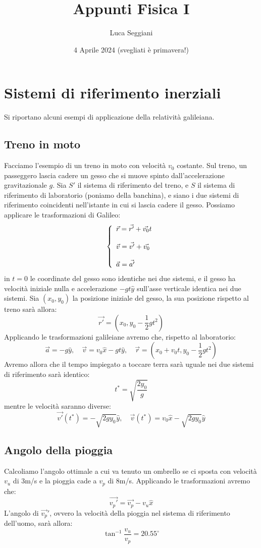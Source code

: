 \documentclass[a4paper,12pt]{article}
\title{Appunti Fisica I}
\author{Luca Seggiani}
\date{4 Aprile 2024 (svegliati è primavera!)}
\begin{document}
\maketitle
\section{Sistemi di riferimento inerziali}
Si riportano alcuni esempi di applicazione della relatività galileiana.
\subsection{Treno in moto}
Facciamo l'esempio di un treno in moto con velocità $v_0$ costante. Sul treno, un passeggero lascia cadere
un gesso che si muove spinto dall'accelerazione gravitazionale $g$. Sia $S'$ il sistema di riferimento del treno,
e $S$ il sistema di riferimento di laboratorio (poniamo della banchina), e siano i due sistemi di riferimento
coincidenti nell'istante in cui si lascia cadere il gesso. Possiamo applicare le trasformazioni di Galileo:
$$ 
\left\{\begin{array}{l}
  \vec{r} = \vec{r'} + \vec{v_0}t \cr \\
  \vec{v} = \vec{v'} + \vec{v_0} \cr \\
  \vec{a} = \vec{a'}
\end{array}\right.
$$
in $t=0$ le coordinate del gesso sono identiche nei due sistemi, e il gesso ha velocità iniziale nulla
e accelerazione $-gt\hat{y}$ sull'asse verticale identica nei due sistemi. Sia $(x_0, y_0)$ la posizione
iniziale del gesso, la sua posizione rispetto al treno sarà allora:
$$ \vec{r'} = (x_0, y_0 -\frac{1}{2}gt^2) $$
Applicando le trasformazioni galileiane avremo che, rispetto al laboratorio:
$$ 
\vec{a} = -g\hat{y}, \quad
\vec{v} = v_0\hat{x} - gt\hat{y}, \quad
\vec{r} = (x_0 + v_0t, y_0 - \frac{1}{2}gt^2) 
$$
Avremo allora che il tempo impiegato a toccare terra sarà uguale nei due sistemi di riferimento sarà identico:
$$ t^* = \sqrt{\frac{2y_0}{g}}$$
mentre le velocità saranno diverse:
$$ \vec{v'}(t^*) = -\sqrt{2gy_0}\hat{y}, \quad \vec{v}(t^*) = v_0\hat{x} - \sqrt{2gy_0}\hat{y} $$
\subsection{Angolo della pioggia}
Calcoliamo l'angolo ottimale a cui va tenuto un ombrello se ci sposta con velocità $v_u$ di 3m/s
e la pioggia cade a $v_p$ di 8m/s. Applicando le trasformazioni avremo che:
$$ \vec{v_p'} = \vec{v_p} - v_u\hat{x}$$
L'angolo di $\vec{v_p}'$, ovvero la velocità della pioggia nel sistema di riferimento dell'uomo, sarà allora:
$$ \tan^{-1}{\frac{v_u}{v_p}} = 20.55^\circ$$
\end{document}
